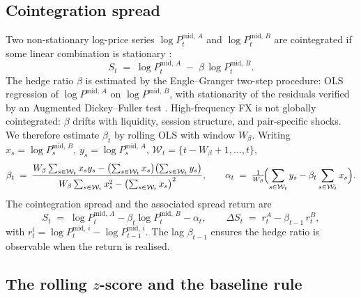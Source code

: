 \subsection{Cointegration spread}\label{sec:spread}

Two non-stationary log-price series $\log P_t^{\mathrm{mid},\,A}$ and $\log P_t^{\mathrm{mid},\,B}$ are cointegrated if some linear combination is stationary \parencite{engle1987cointegration}:
\begin{equation}\label{eq:spreaddef}
    S_t \;=\; \log P_t^{\mathrm{mid},\,A} \;-\; \beta\,\log P_t^{\mathrm{mid},\,B}.
\end{equation}
The hedge ratio $\beta$ is estimated by the Engle--Granger two-step procedure: OLS regression of $\log P^{\mathrm{mid},\,A}$ on $\log P^{\mathrm{mid},\,B}$, with stationarity of the residuals verified by an Augmented Dickey--Fuller test \parencite{dickey1979distribution,said1984testing}. High-frequency FX is not globally cointegrated: $\beta$ drifts with liquidity, session structure, and pair-specific shocks. We therefore estimate $\beta_t$ by rolling OLS with window $W_\beta$. Writing $x_s = \log P_s^{\mathrm{mid},\,B}$, $y_s = \log P_s^{\mathrm{mid},\,A}$, $\mathcal{W}_t = \{t-W_\beta+1,\ldots,t\}$,
\begin{equation}\label{eq:rollingbeta}
    \beta_t \;=\; \frac{W_\beta \sum_{s \in \mathcal{W}_t} x_s y_s - \bigl(\sum_{s \in \mathcal{W}_t} x_s\bigr)\bigl(\sum_{s \in \mathcal{W}_t} y_s\bigr)}{W_\beta \sum_{s \in \mathcal{W}_t} x_s^{2} - \bigl(\sum_{s \in \mathcal{W}_t} x_s\bigr)^{2}},
    \qquad
    \alpha_t \;=\; \tfrac{1}{W_\beta}\!\Bigl(\sum_{s \in \mathcal{W}_t} y_s - \beta_t \sum_{s \in \mathcal{W}_t} x_s\Bigr).
\end{equation}
The cointegration spread and the associated spread return are
\begin{equation}\label{eq:rollingspreadret}
    S_t \;=\; \log P_t^{\mathrm{mid},\,A} - \beta_t \log P_t^{\mathrm{mid},\,B} - \alpha_t,
    \qquad
    \Delta S_t \;=\; r_t^{A} - \beta_{t-1}\, r_t^{B},
\end{equation}
with $r_t^{i} = \log P_t^{\mathrm{mid},\,i} - \log P_{t-1}^{\mathrm{mid},\,i}$. The lag $\beta_{t-1}$ ensures the hedge ratio is observable when the return is realised.

\subsection{The rolling \texorpdfstring{$z$-score}{z-score} and the baseline rule}\label{sec:zscore}

